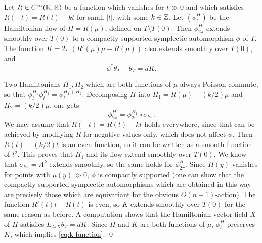 \documentclass[10pt,letterpaper]{article}
\begin{document}
\begin{lemma} \label{th:on-invariant}
Let $R \in C^\infty(\mathbb{R},\mathbb{R})$ be a function which vanishes for $t \gg 0$ and which
satisfies $R(-t) = R(t) - kt$ for small $|t|$, with some $k \in \mathbb{Z}$. Let
$(\phi_t^H)$ be the Hamiltonian flow of $H = R(\mu)$, defined on $T \setminus
T(0)$. Then $\phi_{2\pi}^H$ extends smoothly over $T(0)$ to a compactly
supported symplectic automorphism $\phi$ of $T$. The function $K = 2\pi
\,(R'(\mu)\mu - R(\mu))$ also extends smoothly over $T(0)$, and
\begin{equation} \label{eq:k-function}
\phi^*\theta_T - \theta_T = dK.
\end{equation}
\end{lemma}

\proof Two Hamiltonians $H_1,H_2$ which are both functions of $\mu$ always
Poisson-commute, so that $\phi_t^{H_1} \phi_t^{H_2} = \phi_t^{H_1 + H_2}$.
Decomposing $H$ into $H_1 = R(\mu) - (k/2)\mu$ and $H_2 = (k/2)\mu$, one gets
\[
\phi_{2\pi}^H = \phi_{2\pi}^{H_1} \circ \sigma_{k\pi}.
\]
We may assume that $R(-t) = R(t) - kt$ holds everywhere, since that can be
achieved by modifying $R$ for negative values only, which does not affect
$\phi$. Then $R(t) - (k/2)t$ is an even function, so it can be written as a
smooth function of $t^2$. This proves that $H_1$ and its flow extend smoothly
over $T(0)$. We know that $\sigma_{k\pi} = A^k$ extends smoothly, so the same
holds for $\phi_{2\pi}^H$. Since $H(y)$ vanishes for points with $\mu(y) \gg
0$, $\phi$ is compactly supported (one can show that the compactly supported
symplectic automorphisms which are obtained in this way are precisely those
which are equivariant for the obvious $O(n+1)$-action). The function $R'(t)t -
R(t)$ is even, so $K$ extends smoothly over $T(0)$ for the same reason as
before. A computation shows that the Hamiltonian vector field $X$ of $H$
satisfies $L_{2\pi X}\theta_T = dK$. Since $H$ and $K$ are both functions of
$\mu$, $\phi_t^H$ preserves $K$, which implies \eqref{eq:k-function}. \qed
\end{document}
